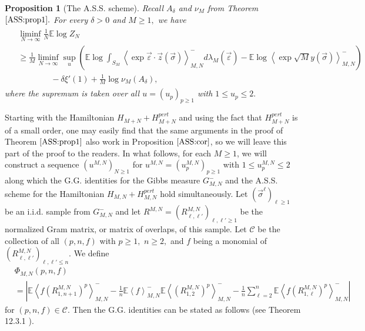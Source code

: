 \documentclass[12pt]{article}
\newcommand{\veps}{\vec{\varepsilon}}
\newcommand{\vsi}{{\vec{\sigma}}}
\newcommand{\vz}{\vec{z}}
\newtheorem{proposition}{\bf Proposition}
\newenvironment{Proof of lemma}{\noindent{\bf Proof of Lemma}}{\hfill$\Box$\newline}
\newenvironment{Proof of theorem}{\noindent{\bf Proof of Theorem}}{\hfill{\footnotesize${\square}$}\newline}
\newenvironment{Proof of theorems}{\noindent{\bf Proof of Theorems}}{\hfill$\Box$\newline}
\newenvironment{Proof of proposition}{\noindent{\bf Proof of Proposition}}{\hfill$\Box$\newline}
\newenvironment{Proof of propositions}{\noindent{\bf Proof of Propositions}}{\hfill$\Box$\newline}
\newenvironment{Proof of exercise}{\noindent{\it Proof of Exercise:}}{\hfill$\Box$}
\numberwithin{equation}{section}
\begin{document}
\begin{proposition}[The A.S.S. scheme]\label{ASS:cor} Recall $A_\delta$ and $\nu_M$ from Theorem $\ref{ASS:prop1}.$
For every $\delta>0$ and $M\geq 1,$ we have
\begin{align}
\begin{split}\label{ASS:cor:eq1}
&\liminf_{N\rightarrow\infty}\frac{1}{N}\mathbb{E}\log Z_N\\
&\geq\frac{1}{M}\liminf_{N\rightarrow\infty}\sup_{u}\left(\mathbb{E}\log \int_{S_M}\left<\exp \veps\cdot \vz (\vsi)\right>_{M,N}^-d\lambda_M(\veps)-
\mathbb{E}\log \left<\exp \sqrt{M}y(\vsi)\right>_{M,N}^-\right)\\
&\qquad\qquad -\delta\xi'(1)+\frac{1}{M}\log \nu_M(A_\delta),
\end{split}
\end{align}
where the supremum is taken over all $u=(u_{p})_{p\geq 1}$ with $1\leq u_p\leq 2.$
\end{proposition}

\smallskip

\noindent Starting with the Hamiltonian $H_{M+N}+H_{M+N}^{pert}$ and using the fact that $H_{M+N}^{pert}$ is of a small order, one may easily find that the same arguments in the proof of Theorem $\ref{ASS:prop1}$ also work in Proposition $\ref{ASS:cor}$, so we will leave this part of the proof to the readers. In what follows, for each $M\geq 1$, we will construct a sequence $(u^{M,N})_{N\geq 1}$ for $u^{M,N}=(u_p^{M,N})_{p\geq 1}$ with $1\leq u_p^{M,N}\leq 2$ along which the G.G. identities for the Gibbs measure $G_{M,N}^-$ and the A.S.S. scheme for the Hamiltonian $H_{M,N}+H_{M,N}^{pert}$ hold simultaneously. Let $(\vsi^\ell)_{\ell\geq 1}$ be an i.i.d. sample from $G_{M,N}^-$ and let $R^{M,N}=(R_{\ell,\ell'}^{M,N})_{\ell,\ell'\geq 1}$ be the normalized Gram matrix, or matrix of overlaps, of this sample. Let $\mathcal{C}$ be the collection of all $(p,n,f)$ with $p\geq 1,$ $n\geq 2,$ and $f$ being a monomial of $(R_{\ell,\ell'}^{M,N})_{\ell,\ell'\leq n}.$ We define
\begin{align*}
&\Phi_{M,N}(p,n,f)\\
&=\left|\mathbb{E}\left<f(R_{1,n+1}^{M,N})^p\right>_{M,N}^--\frac{1}{n}\mathbb{E}\left<f\right>_{M,N}^-
\mathbb{E}\left<(R_{1,2}^{M,N})^p\right>_{M,N}^--\frac{1}{n}\sum_{\ell=2}^n
\mathbb{E}\left<f(R_{1,\ell}^{M,N})^p\right>_{M,N}^-\right|
\end{align*}
for $(p,n,f)\in \mathcal{C}.$ Then the G.G. identities can be stated as follows (see Theorem 12.3.1 \cite{Tal11}).
\end{document}

